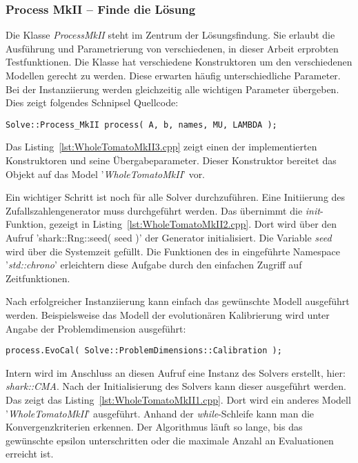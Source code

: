 \subsubsection{Process MkII -- Finde die Lösung} %
%
Die Klasse \textit{ProcessMkII} steht im Zentrum der Lösungsfindung. Sie erlaubt die Ausführung und Parametrierung von verschiedenen, in dieser Arbeit erprobten Testfunktionen. Die Klasse hat verschiedene Konstruktoren um den verschiedenen Modellen gerecht zu werden. Diese erwarten häufig unterschiedliche Parameter. Bei der  Instanziierung werden gleichzeitig alle wichtigen Parameter übergeben. Dies zeigt folgendes Schnipsel Quellcode:
%
\begin{lstlisting}[label=InstanceOfProcessMkII]
Solve::Process_MkII	process( A, b, names, MU, LAMBDA );
\end{lstlisting}
%
Das Listing~\ref{lst:WholeTomatoMkII3.cpp} zeigt einen der implementierten Konstruktoren und seine Übergabeparameter. Dieser Konstruktor bereitet das Objekt auf das Model '\textit{WholeTomatoMkII}' vor.
%

%
Ein wichtiger Schritt ist noch für alle Solver durchzuführen. Eine Initiierung des Zufallszahlengenerator muss durchgeführt werden. Das übernimmt die \textit{init}-Funktion, gezeigt in Listing~\ref{lst:WholeTomatoMkII2.cpp}. Dort wird über den Aufruf 'shark::Rng::seed( seed )' der Generator initialisiert. Die Variable \textit{seed} wird über die Systemzeit gefüllt. Die Funktionen des in  eingeführte Namespace '\textit{std::chrono}' erleichtern diese Aufgabe durch den einfachen Zugriff auf Zeitfunktionen.
%

%				
%
Nach erfolgreicher Instanziierung kann einfach das gewünschte Modell ausgeführt werden. Beispielsweise das Modell der evolutionären Kalibrierung wird unter Angabe der Problemdimension ausgeführt:
%
\begin{lstlisting}[label=CallModel]
process.EvoCal( Solve::ProblemDimensions::Calibration );
\end{lstlisting}
%
Intern wird im Anschluss an diesen Aufruf eine Instanz des Solvers erstellt, hier: \textit{shark::CMA}. Nach der Initialisierung des Solvers kann dieser ausgeführt werden. Das zeigt das Listing~\ref{lst:WholeTomatoMkII1.cpp}. Dort wird ein anderes Modell '\textit{WholeTomatoMkII}' ausgeführt. Anhand der \textit{while}-Schleife kann man die Konvergenzkriterien erkennen. Der Algorithmus läuft so lange, bis das gewünschte epsilon unterschritten oder die maximale Anzahl an Evaluationen erreicht ist.
